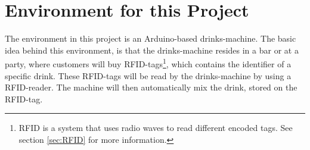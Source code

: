 \section{Environment for this Project}
The environment in this project is an Arduino-based drinks-machine. The basic idea behind this environment, is that the drinks-machine resides in a bar or at a party, where customers will buy RFID-tags\footnote{RFID is a system that uses radio waves to read different encoded tags. See section \ref{sec:RFID} for more information.}, which contains the identifier of a specific drink. These RFID-tags will be read by the drinks-machine by using a RFID-reader. The machine will then automatically mix the drink, stored on the RFID-tag.

